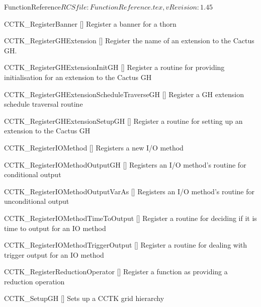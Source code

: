 \begin{cactuspart}{5}{FunctionReference}{$RCSfile: FunctionReference.tex,v $}{$Revision: 1.45 $}
\begin{Lentry}
\item[CCTK\_RegisterBanner]
  [\pageref{CCTK-RegisterBanner}]
  Register a banner for a thorn

\item[CCTK\_RegisterGHExtension]
  [\pageref{CCTK-RegisterGHExtension}]
  Register the name of an extension to the Cactus GH.

\item[CCTK\_RegisterGHExtensionInitGH]
  [\pageref{CCTK-RegisterGHExtensionInitGH}]
  Register a routine for providing initialisation for an extension to the Cactus GH

\item[CCTK\_RegisterGHExtensionScheduleTraverseGH]
  [\pageref{CCTK-RegisterGHExtensionScheduleTraverseGH}]
  Register a GH extension schedule traversal routine

\item[CCTK\_RegisterGHExtensionSetupGH]
  [\pageref{CCTK-RegisterGHExtensionSetupGH}]
  Register a routine for setting up an extension to the Cactus GH

\item[CCTK\_RegisterIOMethod]
  [\pageref{CCTK-RegisterIOMethod}]
  Registers a new I/O method

\item[CCTK\_RegisterIOMethodOutputGH]
  [\pageref{CCTK-RegisterIOMethodOutputGH}]
  Registers an I/O method's routine for conditional output

\item[CCTK\_RegisterIOMethodOutputVarAs]
  [\pageref{CCTK-RegisterIOMethodOutputVarAs}]
  Registers an I/O method's routine for unconditional output

\item[CCTK\_RegisterIOMethodTimeToOutput]
  [\pageref{CCTK-RegisterIOMethodTimeToOutput}]
  Register a routine for deciding if it is time to output for an IO method

\item[CCTK\_RegisterIOMethodTriggerOutput]
  [\pageref{CCTK-RegisterIOMethodTriggerOutput}]
  Register a routine for dealing with trigger output for an IO method

\item[CCTK\_RegisterReductionOperator]
  [\pageref{CCTK-RegisterReductionOperator}]
  Register a function as providing a reduction operation

\item[CCTK\_SetupGH]
  [\pageref{CCTK-SetupGH}]
  Sets up a CCTK grid hierarchy


\end{Lentry}
\end{cactuspart}
